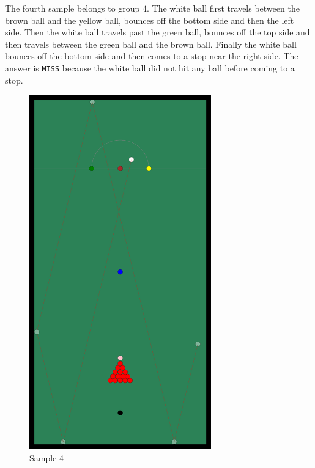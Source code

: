 The fourth sample belongs to group $4$. The white ball first travels between the brown ball and the yellow ball, bounces off the bottom side and then the left side.
Then the white ball travels past the green ball, bounces off the top side and then travels between the green ball and the brown ball.
Finally the white ball bounces off the bottom side and then comes to a stop near the right side.
The answer is \texttt{MISS} because the white ball did not hit any ball before coming to a stop.
\begin{figure}[ht!]
  \centering
    \includegraphics[width=0.7\textwidth]{sample4}
  \caption{Sample 4}
\end{figure}
